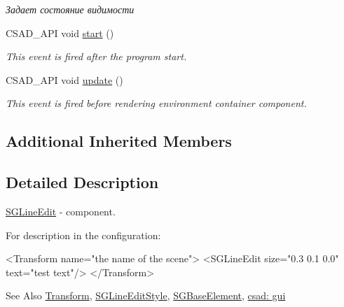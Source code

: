\begin{DoxyCompactItemize}
\begin{DoxyCompactList}\small\item\em Задает состояние видимости \end{DoxyCompactList}\item 
\hypertarget{classcsad_1_1_s_g_line_edit_a9f9d2db8af333e47660e718cbce55c26}{C\-S\-A\-D\-\_\-\-A\-P\-I void \hyperlink{classcsad_1_1_s_g_line_edit_a9f9d2db8af333e47660e718cbce55c26}{start} ()}\label{classcsad_1_1_s_g_line_edit_a9f9d2db8af333e47660e718cbce55c26}

\begin{DoxyCompactList}\small\item\em This event is fired after the program start. \end{DoxyCompactList}\item 
\hypertarget{classcsad_1_1_s_g_line_edit_a1e200a29f617af3184350b90a20f67bf}{C\-S\-A\-D\-\_\-\-A\-P\-I void \hyperlink{classcsad_1_1_s_g_line_edit_a1e200a29f617af3184350b90a20f67bf}{update} ()}\label{classcsad_1_1_s_g_line_edit_a1e200a29f617af3184350b90a20f67bf}

\begin{DoxyCompactList}\small\item\em This event is fired before rendering environment container component. \end{DoxyCompactList}\end{DoxyCompactItemize}
\subsection*{Additional Inherited Members}


\subsection{Detailed Description}
\hyperlink{classcsad_1_1_s_g_line_edit}{S\-G\-Line\-Edit} -\/ component. 

For description in the configuration\-: \begin{DoxyVerb}  <Transform name="the name of the scene">
      <SGLineEdit size="0.3 0.1 0.0" text="test text"/>
  </Transform>
\end{DoxyVerb}


\begin{DoxySeeAlso}{See Also}
\hyperlink{classcsad_1_1_transform}{Transform}, \hyperlink{classcsad_1_1_s_g_line_edit_style}{S\-G\-Line\-Edit\-Style}, \hyperlink{classcsad_1_1_s_g_base_element}{S\-G\-Base\-Element}, \hyperlink{group__scenegui}{csad\-: gui} 
\end{DoxySeeAlso}
